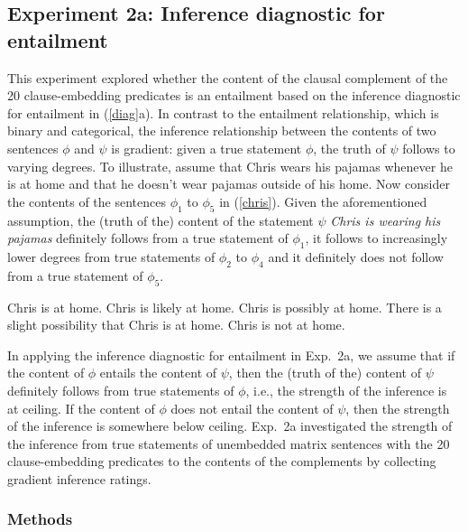 \documentclass[11pt,fleqn]{article}
\newcommand{\6}{\mbox{$[\hspace*{-.6mm}[$}}
\newcommand{\9}{\mbox{$]\hspace*{-.6mm}]$}}
\begin{document}
\subsection{Experiment 2a: Inference diagnostic for entailment}\label{s31}

This experiment explored whether the content of the clausal complement of the 20 clause-embedding predicates is an entailment based on the inference diagnostic for entailment in (\ref{diag}a). In contrast to the entailment relationship, which is binary and categorical, the inference relationship between the contents of two sentences $\phi$ and $\psi$ is gradient: given a true statement $\phi$, the truth of $\psi$ follows to varying degrees. To illustrate, assume that Chris wears his pajamas whenever he is at home and that he doesn't wear pajamas outside of his home. Now consider the contents of the sentences $\phi_1$ to $\phi_5$ in (\ref{chris}). Given the aforementioned assumption, the (truth of the) content of the statement $\psi$ {\em Chris is wearing his pajamas} definitely follows from a true statement of $\phi_1$, it follows to increasingly lower degrees from true statements of $\phi_2$ to $\phi_4$ and it definitely does not follow from a true statement of $\phi_5$. 

\begin{exe}
\ex\label{chris}
\begin{xlist}
 Chris is at home.
 Chris is likely at home.
 Chris is possibly at home.
 There is a slight possibility that Chris is at home.
 Chris is not at home.
\end{xlist}
\end{exe}

In applying the inference diagnostic for entailment in Exp.~2a, we assume that if the content of $\phi$ entails the content of $\psi$, then the (truth of the) content of $\psi$ definitely follows from true statements of $\phi$, i.e., the strength of the inference is at ceiling. If the content of $\phi$ does not entail the content of $\psi$, then the strength of the inference is somewhere below ceiling. Exp.~2a investigated the strength of the inference from true statements of unembedded matrix sentences with the 20 clause-embedding predicates to the contents of the complements by collecting gradient inference ratings.

\subsubsection{Methods}
\end{document}
